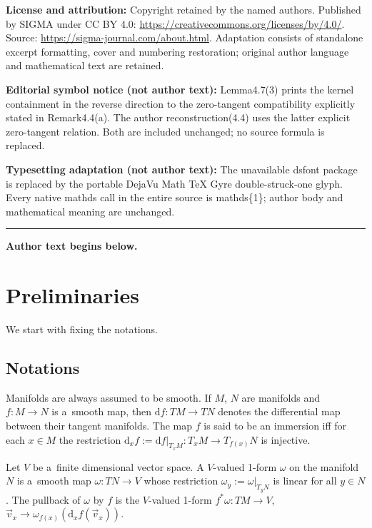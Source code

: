 \documentclass[11pt]{article}
\numberwithin{equation}{section}
\begin{document}
\noindent\textbf{License and attribution:} Copyright retained by the named authors. Published by SIGMA under CC BY 4.0: \url{https://creativecommons.org/licenses/by/4.0/}. Source: \url{https://sigma-journal.com/about.html}. Adaptation consists of standalone excerpt formatting, cover and numbering restoration; original author language and mathematical text are retained.\par
\noindent\textbf{Editorial symbol notice (not author text):} Lemma4.7(3) prints the kernel containment in the reverse direction to the zero-tangent compatibility explicitly stated in Remark4.4(a). The author reconstruction(4.4) uses the latter explicit zero-tangent relation. Both are included unchanged; no source formula is replaced.\par
\noindent\textbf{Typesetting adaptation (not author text):} The unavailable dsfont package is replaced by the portable DejaVu Math TeX Gyre double-struck-one glyph. Every native mathds call in the entire source is mathds\{1\}; author body and mathematical meaning are unchanged.\par
\medskip\hrule\medskip\noindent\textbf{Author text begins below.}\par
\setcounter{section}{1}
\setcounter{subsection}{0}
\setcounter{subsubsection}{0}
\setcounter{Theorem}{0}
\setcounter{equation}{0}
\section{Preliminaries}\label{sec:prep}

We start with f\/ixing the notations.

\subsection{Notations}\label{sec:notations}

Manifolds are always assumed to be smooth.
If $M$, $N$ are manifolds and $f\colon M\rightarrow N$ is a~smooth map, then $\mathrm{d} f\colon TM\rightarrow TN$ denotes
the dif\/ferential map between their tangent manifolds.
The map $f$ is said to be an immersion if\/f for each $x\in M$ the restriction $\mathrm{d}_xf:=\mathrm{d} f|_{T_xM}\colon
T_xM\rightarrow T_{f(x)}N$ is injective.

Let $V$ be a~f\/inite dimensional vector space.
A $V$-valued 1-form $\omega$ on the manifold $N$ is a~smooth map $\omega\colon TN\rightarrow V$ whose restriction
$\omega_y:=\omega|_{T_yN}$ is linear for all $y\in N$.
The pullback of $\omega$ by $f$ is the $V$-valued 1-form $f^{*}\omega\colon TM\rightarrow V$, $\vec{v}_x\rightarrow
\omega_{f(x)}(\mathrm{d}_xf(\vec{v}_x))$.
\end{document}
